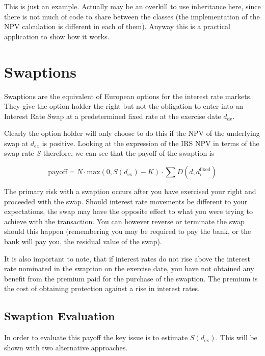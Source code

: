 \begin{finmarkets}
This is just an example. Actually may be an overkill to use inheritance here, since there is not much of code to share between the classes (the implementation of the NPV calculation is different in each of them). Anyway this is a practical application to show how it works.
\end{finmarkets}

\section{Swaptions}
\label{interest-rate-swaptions}

Swaptions are the equivalent of European options for the interest rate markets. They give the option holder the right but not the obligation to enter into an Interest Rate Swap at a predetermined fixed rate at the exercise date \(d_{ex}\).

Clearly the option holder will only choose to do this if the NPV of the underlying swap at \(d_{ex}\) is positive. Looking at the expression of the IRS NPV in terms of the swap rate \(S\) therefore, we can see that the payoff of the swaption is

\begin{equation}
\mathrm{payoff} = N\cdot \mathrm{max}(0, S(d_{\mathrm{ex}}) - K)\cdot\sum D(d, d_i^{\mathrm{fixed}})
\label{eq:swaption_payoff}
\end{equation}

The primary risk with a swaption occurs after you have exercised your right and proceeded with the swap. Should interest rate movements be different to your expectations, the swap may have the opposite effect to what you were trying to achieve with the transaction. You can however reverse or terminate the swap should this happen (remembering you may be required to pay the bank, or the bank will pay you, the residual value of the swap).

It is also important to note, that if interest rates do not rise above the interest rate nominated in the swaption on the exercise date, you have not obtained any benefit from the premium paid for the purchase of the swaption. The premium is the cost of obtaining protection against a rise in interest rates.

\subsection{Swaption Evaluation}

In order to evaluate this payoff the key issue is to estimate $S(d_{\mathrm{ex}})$. This will be shown with two alternative approaches.

